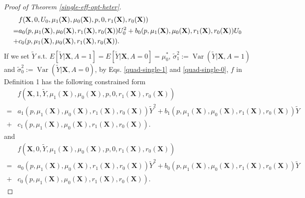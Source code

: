 \documentclass[11pt]{article}
\theoremstyle{referenceplain}
\theoremstyle{referencedefinition}
\theoremstyle{referenceremark}
\begin{document}
\begin{proof}[Proof of Theorem \ref{single-eff-opt-heter}]
\begin{align}\label{quad-single-0}
     &f(\mathbf{X},0,U_0,\mu_1(\mathbf{X}),\mu_0(\mathbf{X}),p,0,r_1(\mathbf{X}),r_0(\mathbf{X})) \notag\\
     =& a_0(p,\mu_1(\mathbf{X}),\mu_0(\mathbf{X}),r_1(\mathbf{X}),r_0(\mathbf{X})) U_0^2 + b_0(p,\mu_1(\mathbf{X}),\mu_0(\mathbf{X}),r_1(\mathbf{X}),r_0(\mathbf{X})) U_0 \notag\\+& c_0(p,\mu_1(\mathbf{X}),\mu_0(\mathbf{X}),r_1(\mathbf{X}),r_0(\mathbf{X})).
\end{align}
If we set $\widetilde{Y}$ s.t. $E[\widetilde{Y}|\mathbf{X},A=1] = E[\widetilde{Y}|\mathbf{X},A=0]=\mu_0^*$, $\widetilde{\sigma}_1^2:=\operatorname{Var}(\widetilde{Y}|\mathbf{X},A=1)$ and $\widetilde{\sigma}_0^2:=\operatorname{Var}(\widetilde{Y}|\mathbf{X},A=0)$, by Eqs. \eqref{quad-single-1} and \eqref{quad-single-0}, $f$ in Definition 1 has the following constrained form 
\begin{align*}
    &f(\mathbf{X},1,\widetilde{Y},\mu_1(\mathbf{X}),\mu_0(\mathbf{X}),p,0,r_1(\mathbf{X}),r_0(\mathbf{X}))\\
     = &a_1(p,\mu_1(\mathbf{X}),\mu_0(\mathbf{X}),r_1(\mathbf{X}),r_0(\mathbf{X})) \widetilde{Y}^2 + b_1(p,\mu_1(\mathbf{X}),\mu_0(\mathbf{X}),r_1(\mathbf{X}),r_0(\mathbf{X})) \widetilde{Y}\\ +& c_1(p,\mu_1(\mathbf{X}),\mu_0(\mathbf{X}),r_1(\mathbf{X}),r_0(\mathbf{X})).
\end{align*}
and
\begin{align*}
    &f(\mathbf{X},0,\widetilde{Y},\mu_1(\mathbf{X}),\mu_0(\mathbf{X}),p,0,r_1(\mathbf{X}),r_0(\mathbf{X}))\\
     = &a_0(p,\mu_1(\mathbf{X}),\mu_0(\mathbf{X}),r_1(\mathbf{X}),r_0(\mathbf{X})) \widetilde{Y}^2 + b_0(p,\mu_1(\mathbf{X}),\mu_0(\mathbf{X}),r_1(\mathbf{X}),r_0(\mathbf{X})) \widetilde{Y}\\ +& c_0(p,\mu_1(\mathbf{X}),\mu_0(\mathbf{X}),r_1(\mathbf{X}),r_0(\mathbf{X})).
\end{align*}


\end{proof}
\end{document}
